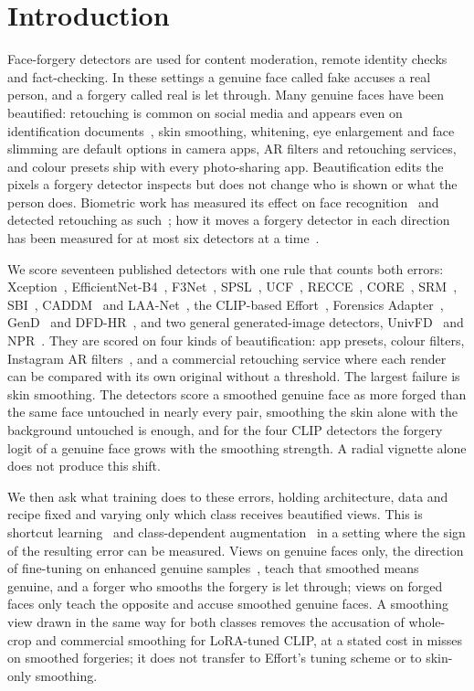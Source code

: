 \documentclass[conference]{IEEEtran}
\begin{document}
\section{Introduction}
Face-forgery detectors are used for content moderation, remote identity checks and fact-checking. In these settings a genuine
face called fake accuses a real person, and a forgery called real is let through. Many genuine faces have been beautified:
retouching is common on social media and appears even on identification documents~\cite{bharati2016,rathgeb2019}, skin
smoothing, whitening, eye enlargement and face slimming are default options in camera apps, AR filters and retouching
services, and colour presets ship with every photo-sharing app. Beautification edits the pixels a forgery detector inspects
but does not change who is shown or what the person does. Biometric work has measured its effect on face
recognition~\cite{rathgeb2019} and detected retouching as such~\cite{bharati2016,jain2018}; how it moves a forgery detector in
each direction has been measured for at most six detectors at a time~\cite{libourel2024,saeed2025,concas2025}.

We score seventeen published detectors with one rule that counts both errors: Xception~\cite{xception},
EfficientNet-B4~\cite{efficientnet}, F3Net~\cite{f3net}, SPSL~\cite{spsl}, UCF~\cite{ucf}, RECCE~\cite{recce}, CORE~\cite{core},
SRM~\cite{srm}, SBI~\cite{sbi}, CADDM~\cite{caddm} and LAA-Net~\cite{laanet}, the CLIP-based Effort~\cite{effort}, Forensics
Adapter~\cite{forensicsadapter}, GenD~\cite{gend2026} and DFD-HR~\cite{dfdhr2026}, and two general generated-image detectors,
UnivFD~\cite{univfd} and NPR~\cite{npr}. They are scored on four kinds of beautification: app presets, colour filters, Instagram
AR filters~\cite{openfilter2022}, and a commercial retouching service where each render can be compared with its own original
without a threshold. The largest failure is skin smoothing. The detectors score a smoothed genuine face as more forged than the
same face untouched in nearly every pair, smoothing the skin alone with the background untouched is enough, and for the four
CLIP detectors the forgery logit of a genuine face grows with the smoothing strength. A radial vignette alone does not produce
this shift.

We then ask what training does to these errors, holding architecture, data and recipe fixed and varying only which class
receives beautified views. This is shortcut learning~\cite{geirhos2020} and class-dependent
augmentation~\cite{balestriero2022} in a setting where the sign of the resulting error can be measured. Views on genuine faces
only, the direction of fine-tuning on enhanced genuine samples~\cite{saeed2025}, teach that smoothed means genuine, and a forger
who smooths the forgery is let through; views on forged faces only teach the opposite and accuse smoothed genuine faces. A
smoothing view drawn in the same way for both classes removes the accusation of whole-crop and commercial smoothing for
LoRA-tuned CLIP, at a stated cost in misses on smoothed forgeries; it does not transfer to Effort's tuning scheme or to
skin-only smoothing.
\end{document}
